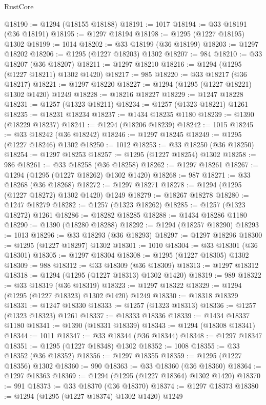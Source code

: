 \begin{lexlean}{RustCore}
\begin{coremodule}
@18190 := @1294 (@18155 @18188)
@18191 := 1017
@18194 := @33 @18191 (@36 @18191)
@18195 := @1297 @18194
@18198 := @1295 (@1227 @18195) @1302
@18199 := 1014
@18202 := @33 @18199 (@36 @18199)
@18203 := @1297 @18202
@18206 := @1295 (@1227 @18203) @1302
@18207 := 984
@18210 := @33 @18207 (@36 @18207)
@18211 := @1297 @18210
@18216 := @1294 (@1295 (@1227 @18211) @1302 @1420)
@18217 := 985
@18220 := @33 @18217 (@36 @18217)
@18221 := @1297 @18220
@18227 := @1294 (@1295 (@1227 @18221) @1302 @1420) @1249
@18228 := @18216 @18227
@18229 := @1247 @18228
@18231 := @1257 (@1323 @18211)
@18234 := @1257 (@1323 @18221) @1261
@18235 := @18231 @18234
@18237 := @1434 @18235 @1180
@18239 := @1390 (@18229 @18237)
@18241 := @1294 (@18206 @18239)
@18242 := 1015
@18245 := @33 @18242 (@36 @18242)
@18246 := @1297 @18245
@18249 := @1295 (@1227 @18246) @1302
@18250 := 1012
@18253 := @33 @18250 (@36 @18250)
@18254 := @1297 @18253
@18257 := @1295 (@1227 @18254) @1302
@18258 := 986
@18261 := @33 @18258 (@36 @18258)
@18262 := @1297 @18261
@18267 := @1294 (@1295 (@1227 @18262) @1302 @1420)
@18268 := 987
@18271 := @33 @18268 (@36 @18268)
@18272 := @1297 @18271
@18278 := @1294 (@1295 (@1227 @18272) @1302 @1420) @1249
@18279 := @18267 @18278
@18280 := @1247 @18279
@18282 := @1257 (@1323 @18262)
@18285 := @1257 (@1323 @18272) @1261
@18286 := @18282 @18285
@18288 := @1434 @18286 @1180
@18290 := @1390 (@18280 @18288)
@18292 := @1294 (@18257 @18290)
@18293 := 1013
@18296 := @33 @18293 (@36 @18293)
@18297 := @1297 @18296
@18300 := @1295 (@1227 @18297) @1302
@18301 := 1010
@18304 := @33 @18301 (@36 @18301)
@18305 := @1297 @18304
@18308 := @1295 (@1227 @18305) @1302
@18309 := 988
@18312 := @33 @18309 (@36 @18309)
@18313 := @1297 @18312
@18318 := @1294 (@1295 (@1227 @18313) @1302 @1420)
@18319 := 989
@18322 := @33 @18319 (@36 @18319)
@18323 := @1297 @18322
@18329 := @1294 (@1295 (@1227 @18323) @1302 @1420) @1249
@18330 := @18318 @18329
@18331 := @1247 @18330
@18333 := @1257 (@1323 @18313)
@18336 := @1257 (@1323 @18323) @1261
@18337 := @18333 @18336
@18339 := @1434 @18337 @1180
@18341 := @1390 (@18331 @18339)
@18343 := @1294 (@18308 @18341)
@18344 := 1011
@18347 := @33 @18344 (@36 @18344)
@18348 := @1297 @18347
@18351 := @1295 (@1227 @18348) @1302
@18352 := 1008
@18355 := @33 @18352 (@36 @18352)
@18356 := @1297 @18355
@18359 := @1295 (@1227 @18356) @1302
@18360 := 990
@18363 := @33 @18360 (@36 @18360)
@18364 := @1297 @18363
@18369 := @1294 (@1295 (@1227 @18364) @1302 @1420)
@18370 := 991
@18373 := @33 @18370 (@36 @18370)
@18374 := @1297 @18373
@18380 := @1294 (@1295 (@1227 @18374) @1302 @1420) @1249

\end{coremodule}
\end{lexlean}

